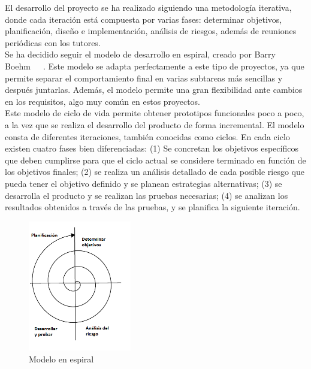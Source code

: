 El desarrollo del proyecto se ha realizado siguiendo una metodología iterativa, donde cada iteración está compuesta por varias fases: determinar objetivos, planificación, diseño e implementación, análisis de riesgos, además de reuniones periódicas con los tutores.\\

Se ha decidido seguir el modelo de desarrollo en espiral, creado por Barry Boehm~\cite{modelo_espiral}~\cite{modelo_espiral1}~\cite{modelo_espiral2}. Este modelo se adapta perfectamente a este tipo de proyectos, ya que permite separar el comportamiento final en varias subtareas más sencillas y después juntarlas. Además, el modelo permite una gran flexibilidad ante cambios en los requisitos, algo muy común en estos proyectos.\\

Este modelo de ciclo de vida permite obtener prototipos funcionales poco a poco, a la vez que se realiza el desarrollo del producto de forma incremental. El modelo consta de diferentes iteraciones, también conocidas como ciclos. En cada ciclo existen cuatro fases bien diferenciadas: (1) Se concretan los objetivos específicos que deben cumplirse para que el ciclo actual se considere terminado en función de los objetivos finales; (2) se realiza un análisis detallado de cada posible riesgo que pueda tener el objetivo definido y se planean estrategias alternativas; (3) se desarrolla el producto y se realizan las pruebas necesarias; (4) se analizan los resultados obtenidos a través de las pruebas, y se planifica la siguiente iteración.\\


\begin{figure}[H]
  \begin{center}
    \includegraphics[width=0.4\textwidth]{figures/Objetivos/espiral.png}
		\caption{Modelo en espiral}
		\label{fig.espiral}
		\end{center}
\end{figure}

